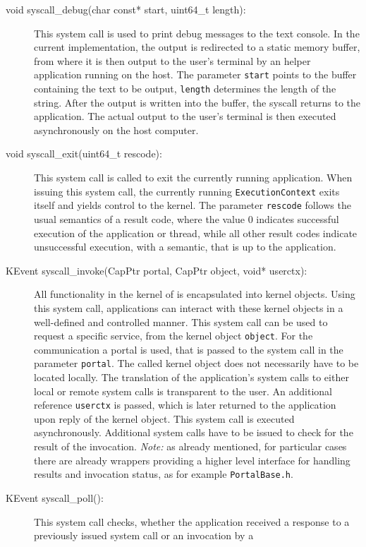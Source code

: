 \begin{description}
\item[void syscall\_debug(char const* start, uint64\_t length):] This system
call is used to print debug messages to the text console. In the current
implementation, the output is redirected to a static memory buffer, from where
it is then output to the user's terminal by an helper application running on the
\mythos host. The parameter \texttt{start} points to the buffer containing the
text to be output, \texttt{length} determines the length of the string. After
the output is written into the buffer, the syscall returns to the application.
The actual output to the user's terminal is then executed asynchronously on the
host computer.
\item[void syscall\_exit(uint64\_t rescode):] This system call is called to exit
the currently running application. When issuing this system call, the currently
running \texttt{ExecutionContext} exits itself and yields control to the kernel.
The parameter \texttt{rescode} follows the usual semantics of a result code,
where the value $0$ indicates successful execution of the application or thread,
while all other result codes indicate unsuccessful execution, with a semantic,
that is up to the application.
\item[KEvent syscall\_invoke(CapPtr portal, CapPtr object, void* userctx):] All
functionality in the kernel of \mythos is encapsulated into kernel objects.
Using this system call, applications can interact with these kernel objects in a
well-defined and controlled manner. This system call can be used to request a
specific service, from the kernel object \texttt{object}. For the communication
a portal is used, that is passed to the system call in the parameter
\texttt{portal}. The called kernel object does not necessarily have to be
located locally. The translation of the application's system calls to either
local or remote system calls is transparent to the user. An additional reference
\texttt{userctx} is passed, which is later returned to the application upon
reply of the kernel object. This system call is executed asynchronously.
Additional system calls have to be issued to check for the result of the
invocation. \emph{Note:} as already mentioned, for particular cases there are
already wrappers providing a higher level interface for handling results and
invocation status, as for example \texttt{PortalBase.h}.
\item[KEvent syscall\_poll():] This system call checks, whether the application
received a response to a previously issued system call or an invocation by a

\end{description}
